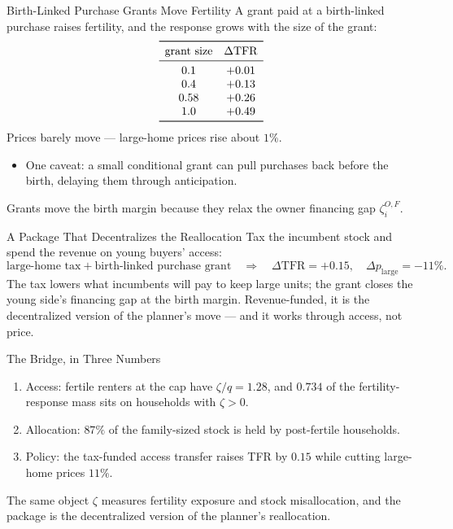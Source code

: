 \documentclass[aspectratio=169,10pt]{beamer}
\providecommand{\1}{\mathbf 1}
\begin{document}
\begin{frame}{Birth-Linked Purchase Grants Move Fertility}
  A grant paid at a birth-linked purchase raises fertility, and the response grows with the size of the grant:
  \[
  \begin{array}{cc}
  \toprule
  \text{grant size} & \Delta \mathrm{TFR}\\
  \midrule
  0.1 & +0.01\\
  0.4 & +0.13\\
  0.58 & +0.26\\
  1.0 & +0.49\\
  \bottomrule
  \end{array}
  \]
  Prices barely move --- large-home prices rise about $1\%$.
  \begin{itemize}
    \item One caveat: a small conditional grant can pull purchases back before the birth, delaying them through anticipation.
  \end{itemize}
  Grants move the birth margin because they relax the owner financing gap $\zeta_i^{O,F}$.
\end{frame}

\begin{frame}{A Package That Decentralizes the Reallocation}
  Tax the incumbent stock and spend the revenue on young buyers' access:
  \[
  \text{large-home tax}+\text{birth-linked purchase grant}
  \quad\Rightarrow\quad
  \Delta \mathrm{TFR}=+0.15,\quad
  \Delta p_{\text{large}}=-11\%.
  \]
  The tax lowers what incumbents will pay to keep large units; the grant closes the young side's financing gap at the birth margin. Revenue-funded, it is the decentralized version of the planner's move --- and it works through access, not price.
\end{frame}

\begin{frame}{The Bridge, in Three Numbers}
  \begin{enumerate}
    \item Access: fertile renters at the cap have $\zeta/q=1.28$, and $0.734$ of the fertility-response mass sits on households with $\zeta>0$.
    \item Allocation: $87\%$ of the family-sized stock is held by post-fertile households.
    \item Policy: the tax-funded access transfer raises TFR by $0.15$ while cutting large-home prices $11\%$.
  \end{enumerate}
  The same object $\zeta$ measures fertility exposure and stock misallocation, and the package is the decentralized version of the planner's reallocation.
\end{frame}
\end{document}
